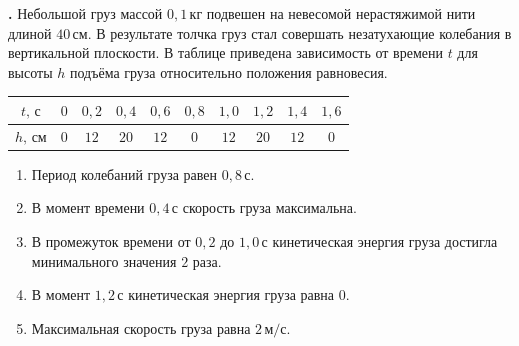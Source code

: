 \documentclass[12pt,a4paper]{article}
\newif\ifShowSolutions
\newcounter{banktask}
\newcommand{\BankTask}[3]{%
  \refstepcounter{banktask}%
  \Needspace{35mm}\par\medskip\noindent\begin{minipage}{\linewidth}%
  \noindent\textbf{\thebanktask.}\quad #2\par
  \ifShowSolutions
    #3\par
    \ifdefined\TutorEdition
      \ifcsname TutorSource#1\endcsname
        \smallskip{\small\csname TutorSource#1\endcsname\par}%
      \fi
    \fi
  \fi
  \end{minipage}\par\medskip
}
\begin{document}
\BankTask{12C0AE}{
Небольшой груз массой $0{,}1\,\text{кг}$ подвешен на невесомой нерастяжимой нити длиной $40\,\text{см}$. В результате толчка груз стал совершать незатухающие колебания в вертикальной плоскости. В таблице приведена зависимость от времени $t$ для высоты $h$ подъёма груза относительно положения равновесия.
\begin{center}{\small\setlength{\tabcolsep}{3pt}\begin{tabular}{|c|c|c|c|c|c|c|c|c|c|}\hline $t,\,\text{с}$ & $0$ & $0{,}2$ & $0{,}4$ & $0{,}6$ & $0{,}8$ & $1{,}0$ & $1{,}2$ & $1{,}4$ & $1{,}6$ \\\hline $h,\,\text{см}$ & $0$ & $12$ & $20$ & $12$ & $0$ & $12$ & $20$ & $12$ & $0$ \\\hline\end{tabular}}\end{center}
\begin{enumerate}
\item Период колебаний груза равен $0{,}8\,\text{с}$.
\item В момент времени $0{,}4\,\text{с}$ скорость груза максимальна.
\item В промежуток времени от $0{,}2$ до $1{,}0\,\text{с}$ кинетическая энергия груза достигла минимального значения $2$ раза.
\item В момент $1{,}2\,\text{с}$ кинетическая энергия груза равна $0$.
\item Максимальная скорость груза равна $2\,\text{м}/\text{с}$.
\end{enumerate}
}{
\smallskip\noindent\textbf{Решение от GPT}\par
При $t=1{,}2\,\text{с}$ груз на максимальной высоте, поэтому $E_{\text{к}}=0$. Из сохранения энергии $mv_{\max}^2/2=mgh_{\max}$: $v_{\max}=\sqrt{2\cdot10\cdot0{,}2}=2\,\text{м}/\text{с}$. Высота повторяется через полпериода, поэтому $T=1{,}6\,\text{с}$; на интервале $0{,}2\! -\!1{,}0\,\text{с}$ минимум кинетической энергии один. Ответ: $45$.
}
\end{document}
